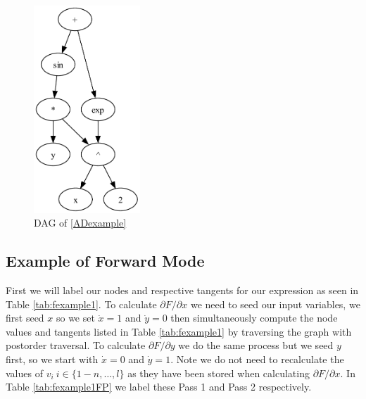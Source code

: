 \documentclass{article}
\begin{document}
\begin{figure}[h!]
    \includegraphics[width=4cm]{images/Graph_Example2.pdf}
    \caption{DAG of \eqref{ADexample}}
    \label{fig:DAGgraph}
\end{figure}

\subsection{Example of Forward Mode}

First we will label our nodes and respective tangents for our expression as seen in Table \ref{tab:fexample1}. To calculate $\partial F / \partial x$ we need to seed our input variables, we first seed $x$ so we set $\dot{x}=1$ and $\dot{y}=0$ then simultaneously compute the node values and tangents listed in Table \ref{tab:fexample1} by traversing the graph with postorder traversal. To calculate $\partial F / \partial y$ we do the same process but we seed $y$ first, so we start with $\dot{x}=0$ and $\dot{y}=1$. Note we do not need to recalculate the values of $v_i \ i \in \{1-n, \ldots, l \}$ as they have been stored when calculating $\partial F / \partial x$. In Table \ref{tab:fexample1FP} we label these Pass 1 and Pass 2 respectively.
\end{document}

